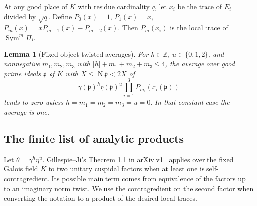 \documentclass[11pt]{article}
\newtheorem{lemma}[theorem]{Lemma}
\theoremstyle{definition}\newtheorem{definition}[theorem]{Definition}
\newcommand{\Z}{\mathbb Z}
\newcommand{\Sym}{\operatorname{Sym}}
\newcommand{\Nm}{\operatorname{N}}
\begin{document}
At any good place of $K$ with residue cardinality $q$,
let $x_i$ be the trace of $E_i$ divided by $\sqrt q$.
Define $P_0(x)=1$, $P_1(x)=x$,
$P_m(x)=xP_{m-1}(x)-P_{m-2}(x)$.
Then $P_m(x_i)$ is the local trace of $\Sym^m\Pi_i$.

\begin{lemma}[Fixed-object twisted averages]\label{lem:averages}
For $h\in\Z$, $u\in\{0,1,2\}$, and nonnegative
$m_1,m_2,m_3$ with
$|h|+m_1+m_2+m_3\le4$, the average over good prime
ideals $\mathfrak p$ of $K$ with $X\le\Nm\mathfrak p<2X$ of
\begin{equation}\label{eq:monomial}
 \gamma(\mathfrak p)^h\eta(\mathfrak p)^u
 \prod_{i=1}^3P_{m_i}(x_i(\mathfrak p))
\end{equation}
tends to zero unless $h=m_1=m_2=m_3=u=0$.
In that constant case the average is one.
\end{lemma}

\subsection{The finite list of analytic products}
Let $\theta=\gamma^h\eta^u$.
Gillespie--Ji's Theorem 1.1 in arXiv v1~\cite{gillespieji} applies over
the fixed Galois field $K$ to two unitary cuspidal factors
when at least one is self-contragredient.
Its possible main term comes from equivalence of the
factors up to an imaginary norm twist. We use the
contragredient on the second factor when converting
the notation to a product of the desired local traces.
\end{document}
